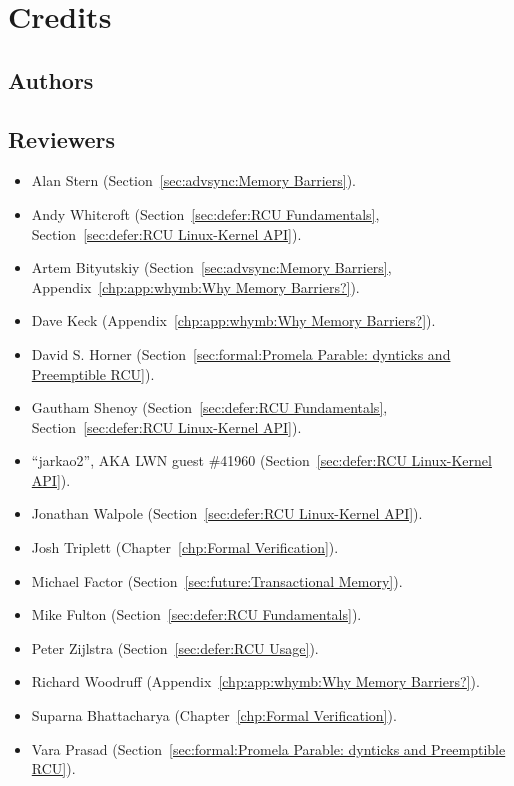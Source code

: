 
\chapter{Credits}
\label{app:ack:Credits}
%

\section{Authors}


\section{Reviewers}

\begin{itemize}
\item	Alan Stern (Section~\ref{sec:advsync:Memory Barriers}).
\item	Andy Whitcroft (Section~\ref{sec:defer:RCU Fundamentals},
	Section~\ref{sec:defer:RCU Linux-Kernel API}).
\item	Artem Bityutskiy (Section~\ref{sec:advsync:Memory Barriers},
	Appendix~\ref{chp:app:whymb:Why Memory Barriers?}).
\item	Dave Keck (Appendix~\ref{chp:app:whymb:Why Memory Barriers?}).
\item	David S. Horner
	(Section~\ref{sec:formal:Promela Parable: dynticks and Preemptible RCU}).
\item	Gautham Shenoy (Section~\ref{sec:defer:RCU Fundamentals},
	Section~\ref{sec:defer:RCU Linux-Kernel API}).
\item	``jarkao2'', AKA LWN guest \#41960 (Section~\ref{sec:defer:RCU Linux-Kernel API}).
\item	Jonathan Walpole (Section~\ref{sec:defer:RCU Linux-Kernel API}).
\item	Josh Triplett (Chapter~\ref{chp:Formal Verification}).
\item	Michael Factor (Section~\ref{sec:future:Transactional Memory}).
\item	Mike Fulton (Section~\ref{sec:defer:RCU Fundamentals}).
\item	Peter Zijlstra
	(Section~\ref{sec:defer:RCU Usage}). %
\item	Richard Woodruff (Appendix~\ref{chp:app:whymb:Why Memory Barriers?}).
\item	Suparna Bhattacharya (Chapter~\ref{chp:Formal Verification}).
\item	Vara Prasad
	(Section~\ref{sec:formal:Promela Parable: dynticks and Preemptible RCU}).
\end{itemize}

